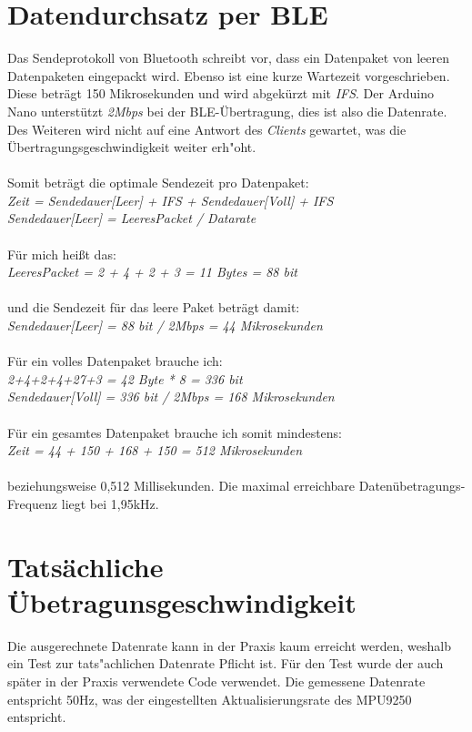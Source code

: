 \section{Datendurchsatz per BLE}

Das Sendeprotokoll von Bluetooth schreibt vor, dass ein Datenpaket von
leeren Datenpaketen eingepackt wird. Ebenso ist eine kurze Wartezeit vorgeschrieben. 
Diese beträgt 150 Mikrosekunden und wird abgekürzt mit \textit{IFS}.
Der Arduino Nano unterstützt \textit{2Mbps} bei der BLE-Übertragung, dies ist also die Datenrate.
Des Weiteren wird nicht auf eine Antwort des \textit{Clients} gewartet, was die 
Übertragungsgeschwindigkeit weiter erh"oht.\\
\\
Somit beträgt die optimale Sendezeit pro Datenpaket:\\
\textit{Zeit = Sendedauer[Leer] + IFS + Sendedauer[Voll] + IFS\\
Sendedauer[Leer] = LeeresPacket / Datarate}\\
\\
Für mich heißt das:\\
\textit{LeeresPacket = 2 + 4 + 2 + 3 = 11 Bytes = 88 bit}\\
\\
und die Sendezeit für das leere Paket beträgt damit:\\
\textit{Sendedauer[Leer] = 88 bit / 2Mbps = 44 Mikrosekunden}\\
\\
Für ein volles Datenpaket brauche ich:\\
\textit{2+4+2+4+27+3 = 42 Byte * 8 = 336 bit\\
Sendedauer[Voll] = 336 bit / 2Mbps = 168 Mikrosekunden}\\
\\
Für ein gesamtes Datenpaket brauche ich somit mindestens:\\
\textit{Zeit = 44 + 150 + 168 + 150 = 512 Mikrosekunden}\\
\\
beziehungsweise 0,512 Millisekunden. Die maximal erreichbare Datenübetragungs-Frequenz
liegt bei 1,95kHz. 


\section{Tatsächliche Übetragunsgeschwindigkeit}
Die ausgerechnete Datenrate kann in der Praxis kaum erreicht werden, weshalb ein Test zur 
tats"achlichen Datenrate Pflicht ist. Für den Test wurde der auch später in der Praxis verwendete
Code verwendet. Die gemessene Datenrate entspricht 50Hz, was der eingestellten Aktualisierungsrate 
des MPU9250 entspricht. 